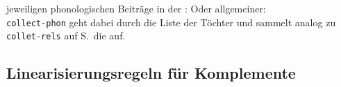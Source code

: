 jeweiligen phonologischen Beiträge in der \dtrsl:
\ea
{}
\z
Oder allgemeiner:
\ea
{} \impl\\
\z
\texttt{collect-phon} geht dabei durch die Liste der Töchter und sammelt analog zu
\texttt{collet-rels} auf S.\,\pageref{constraint-collect-rels} die \phonwe auf.
%

\subsection{Linearisierungsregeln für Komplemente}

